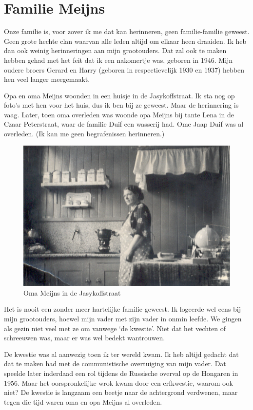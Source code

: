 \documentclass[10pt,twoside, openright]{memoir}
\begin{document}
\thispagestyle{empty}
\chapter{Familie Meijns} %
\label{cha:familie_meijns}


Onze familie is, voor zover ik me dat kan herinneren, geen familie-familie geweest. Geen grote hechte clan waarvan alle leden altijd om elkaar heen draaiden. Ik heb dan ook weinig herinneringen aan mijn grootouders. Dat zal ook te maken hebben gehad met het feit dat ik een nakomertje was, geboren in 1946. Mijn oudere broers Gerard en Harry (geboren in respectievelijk 1930 en 1937) hebben hen veel langer meegemaakt. 

Opa en oma Meijns woonden in een huisje in de Jasykoffstraat. Ik sta nog op foto’s met hen voor het huis, dus ik ben bij ze geweest. Maar de herinnering is vaag. Later, toen oma overleden was woonde opa Meijns bij tante Lena in de Czaar Peterstraat, waar de familie Duif een wasserij had. Ome Jaap Duif was al overleden. (Ik kan me geen begrafenissen herinneren.)

\begin{figure}
\includegraphics[width=\textwidth]{img/ch1/omaJasykofstr}
\caption*{\footnotesize Oma Meijns in de Jasykoffstraat}
\end{figure}

Het is nooit een zonder meer hartelijke familie geweest. Ik logeerde wel eens bij mijn grootouders, hoewel mijn vader met zijn vader in onmin leefde. We gingen als gezin niet veel met ze om vanwege `de kwestie'. Niet dat het vechten of schreeuwen was, maar er was wel bedekt wantrouwen.

De kwestie was al aanwezig toen ik ter wereld kwam. Ik heb altijd gedacht dat dat te maken had met de communistische overtuiging van mijn vader. Dat speelde later inderdaad een rol tijdens de Russische overval op de Hongaren in 1956. Maar het oorspronkelijke wrok kwam door een erfkwestie, waarom ook niet? De kwestie is langzaam een beetje naar de achtergrond verdwenen, maar tegen die tijd waren oma en opa Meijns al overleden.
\end{document}
